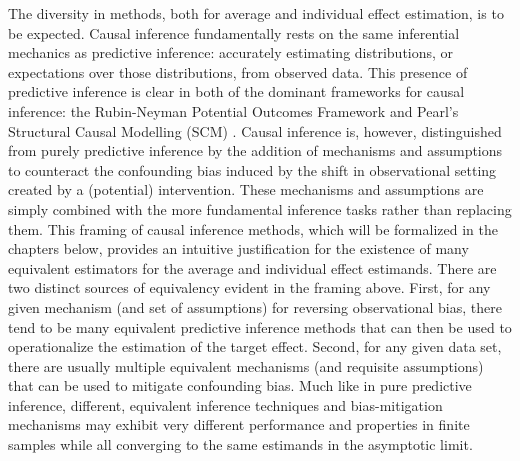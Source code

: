 \documentclass[../main.tex]{subfiles}
\begin{document}
\vspace{\baselineskip}

The diversity in methods, both for average and individual effect estimation, is to be expected. Causal inference fundamentally rests on the same inferential mechanics as predictive inference: accurately estimating distributions, or expectations over those distributions, from observed data. This presence of predictive inference is clear in both of the dominant frameworks for causal inference: the Rubin-Neyman Potential Outcomes Framework \parencite{Holland1986StatisticsInference} and Pearl’s Structural Causal Modelling (SCM) \parencite{Pearl2009CausalOverview}. Causal inference is, however, distinguished from purely predictive inference by the addition of mechanisms and assumptions to counteract the confounding bias induced by the shift in observational setting created by a (potential) intervention. These mechanisms and assumptions are simply combined with the more fundamental inference tasks rather than replacing them. This framing of causal inference methods, which will be formalized in the chapters below, provides an intuitive justification for the existence of many equivalent estimators for the average and individual effect estimands. There are two distinct sources of equivalency evident in the framing above. First, for any given mechanism (and set of assumptions) for reversing observational bias, there tend to be many equivalent predictive inference methods that can then be used to operationalize the estimation of the target effect. Second, for any given data set, there are usually multiple equivalent mechanisms (and requisite assumptions) that can be used to mitigate confounding bias. Much like in pure predictive inference, different, equivalent inference techniques and bias-mitigation mechanisms may exhibit very different performance and properties in finite samples while all converging to the same estimands in the asymptotic limit.\par
\end{document}
